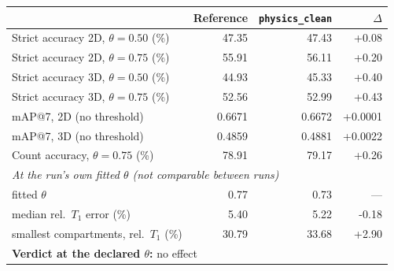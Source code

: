 \renewcommand{\arraystretch}{1.05}
\begin{tabular}{lrrr}
\toprule
 & Reference & \texttt{physics\_clean} & $\Delta$ \\
\midrule
Strict accuracy 2D, $\theta = 0.50$ (\%) & 47.35 & 47.43 & +0.08 \\
Strict accuracy 2D, $\theta = 0.75$ (\%) & 55.91 & 56.11 & +0.20 \\
Strict accuracy 3D, $\theta = 0.50$ (\%) & 44.93 & 45.33 & +0.40 \\
Strict accuracy 3D, $\theta = 0.75$ (\%) & 52.56 & 52.99 & +0.43 \\
\midrule
mAP@7, 2D (no threshold) & 0.6671 & 0.6672 & +0.0001 \\
mAP@7, 3D (no threshold) & 0.4859 & 0.4881 & +0.0022 \\
\midrule
Count accuracy, $\theta = 0.75$ (\%) & 78.91 & 79.17 & +0.26 \\
\midrule
\multicolumn{4}{l}{\emph{At the run's own fitted $\theta$ (not comparable between runs)}} \\
\quad fitted $\theta$ & 0.77 & 0.73 & --- \\
\quad median rel.\ $T_1$ error (\%) & 5.40 & 5.22 & -0.18 \\
\quad smallest compartments, rel.\ $T_1$ (\%) & 30.79 & 33.68 & +2.90 \\
\midrule
\multicolumn{4}{l}{\textbf{Verdict at the declared $\theta$:} no effect} \\
\bottomrule
\end{tabular}
